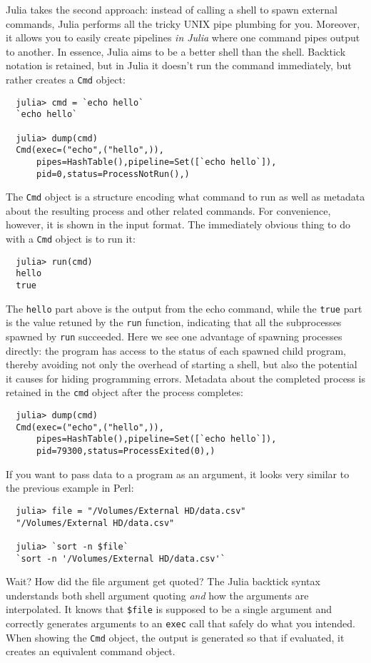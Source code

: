 \documentclass{article}
\begin{document}
Julia takes the second approach:
instead of calling a shell to spawn external commands, Julia performs all the tricky UNIX pipe plumbing for you.
Moreover, it allows you to easily create pipelines \emph{in Julia} where one command pipes output to another.
In essence, Julia aims to be a better shell than the shell.
Backtick notation is retained, but in Julia it doesn't run the command immediately, but rather creates a \verb|Cmd| object:
\begin{verbatim}
  julia> cmd = `echo hello`
  `echo hello`

  julia> dump(cmd)
  Cmd(exec=("echo",("hello",)),
      pipes=HashTable(),pipeline=Set([`echo hello`]),
      pid=0,status=ProcessNotRun(),)
\end{verbatim}
The \verb|Cmd| object is a structure encoding what command to run as well as metadata about the resulting process and other related commands.
For convenience, however, it is shown in the input format.
The immediately obvious thing to do with a \verb|Cmd| object is to run it:
\begin{verbatim}
  julia> run(cmd)
  hello
  true
\end{verbatim}
The \verb|hello| part above is the output from the echo command, while the \verb|true| part is the value retuned by the \verb|run| function, indicating that all the subprocesses spawned by \verb|run| succeeded.
Here we see one advantage of spawning processes directly:
the program has access to the status of each spawned child program, thereby avoiding not only the overhead of starting a shell, but also the potential it causes for hiding programming errors.
Metadata about the completed process is retained in the \verb|cmd| object after the process completes:
\begin{verbatim}
  julia> dump(cmd)
  Cmd(exec=("echo",("hello",)),
      pipes=HashTable(),pipeline=Set([`echo hello`]),
      pid=79300,status=ProcessExited(0),)
\end{verbatim}

If you want to pass data to a program as an argument, it looks very similar to the previous example in Perl:
\begin{verbatim}
  julia> file = "/Volumes/External HD/data.csv"
  "/Volumes/External HD/data.csv"

  julia> `sort -n $file`
  `sort -n '/Volumes/External HD/data.csv'`
\end{verbatim}
Wait? How did the file argument get quoted?
The Julia backtick syntax understands both shell argument quoting \emph{and} how the arguments are interpolated.
It knows that \verb|$file| is supposed to be a single argument and correctly generates arguments to an \verb|exec| call that safely do what you intended.
When showing the \verb|Cmd| object, the output is generated so that if evaluated, it creates an equivalent command object.
\end{document}
